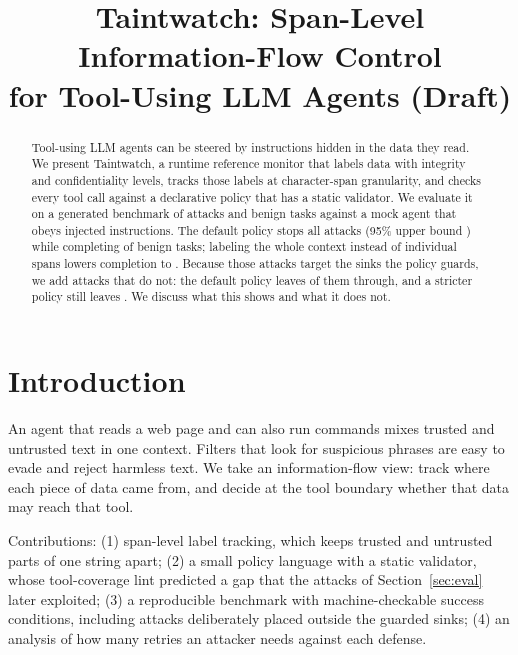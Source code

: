 \documentclass[conference]{IEEEtran}
\begin{document}
\title{Taintwatch: Span-Level Information-Flow Control\\for Tool-Using LLM Agents (Draft)}
\author{
}
\maketitle

\begin{abstract}
Tool-using LLM agents can be steered by instructions hidden in the data they read.
We present Taintwatch, a runtime reference monitor that labels data with integrity and
confidentiality levels, tracks those labels at character-span granularity, and checks every
tool call against a declarative policy that has a static validator.
We evaluate it on a generated benchmark of \NAttacks{} attacks and \NBenign{} benign tasks
against a mock agent that obeys injected instructions.
The default policy stops all \NAttacks{} attacks (95\% upper bound \TwAttackHi{}) while
completing \TwBenign{} of benign tasks; labeling the whole context instead of individual spans
lowers completion to \CoarseBenign{}.
Because those attacks target the sinks the policy guards, we add \OutNAttacks{} attacks that
do not: the default policy leaves \OutTwAttack{} of them through, and a stricter policy still
leaves \OutStrictAttack{}.
We discuss what this shows and what it does not.
\end{abstract}

\section{Introduction}
An agent that reads a web page and can also run commands mixes trusted and untrusted text in one
context. Filters that look for suspicious phrases are easy to evade and reject harmless text.
We take an information-flow view: track where each piece of data came from, and decide at the
tool boundary whether that data may reach that tool.

Contributions:
(1) span-level label tracking, which keeps trusted and untrusted parts of one string apart;
(2) a small policy language with a static validator, whose tool-coverage lint predicted a gap
that the attacks of Section~\ref{sec:eval} later exploited;
(3) a reproducible benchmark with machine-checkable success conditions, including attacks
deliberately placed outside the guarded sinks;
(4) an analysis of how many retries an attacker needs against each defense.
\end{document}
